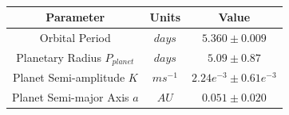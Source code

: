 \begin{table}[htb]
    \centering
    \begin{tabular}{ccc}
        \toprule
        \toprule
        Parameter & Units & Value \\
        \midrule
        Orbital Period & $days$ & $5.360 \pm 0.009$ \\
        \addlinespace
        Planetary Radius $P_{planet}$ & $days$ & $5.09 \pm 0.87$  \\
        \addlinespace
        Planet Semi-amplitude $K$ & $ms^{-1}$ & $2.24e^{-3} \pm 0.61e^{-3}$ \\
        \addlinespace
        Planet Semi-major Axis $a$ & $AU$ & $0.051 \pm 0.020$ \\
        \bottomrule
    \end{tabular}
    \caption{}
    \label{tab:q1_planet_params}
\end{table}
